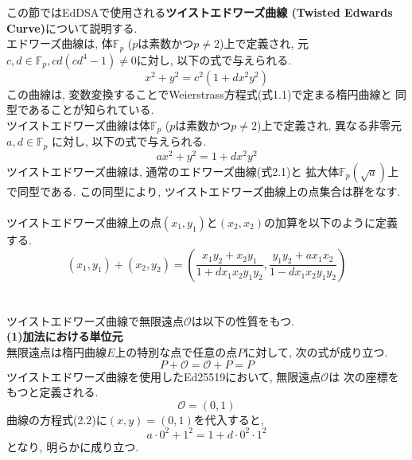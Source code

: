 この節ではEdDSAで使用される\textbf{ツイストエドワーズ曲線
(Twisted Edwards Curve)}について説明する.\\
\indent エドワーズ曲線は, 体$\mathbb{F}_p$ ($p$は素数かつ$p\neq 2$)上で定義され, 
元$c,d\in \mathbb{F}_p, cd(cd^{4}-1)\neq 0$に対し, 
以下の式で与えられる.
\begin{equation}
  x^2 + y^2 = c^2(1+dx^2y^2)
\end{equation}
この曲線は, 変数変換することでWeierstrass方程式(式1.1)で定まる楕円曲線と
同型であることが知られている\cite{edwarscurve-to-ellipticcurve}.\\
\indent ツイストエドワーズ曲線は体$\mathbb{F}_p$ ($p$は素数かつ$p\neq 2$)上で定義され, 
異なる非零元$a,d\in \mathbb{F}_p$ に対し, 以下の式で与えられる.
\begin{equation}
  ax^2 + y^2 = 1 + dx^2y^2
\end{equation}
ツイストエドワーズ曲線は, 通常のエドワーズ曲線(式2.1)と
拡大体$\mathbb{F}_p (\sqrt{a})$上で同型である. この同型により, 
ツイストエドワーズ曲線上の点集合は群をなす\cite{twisted}.\\[1em]
\\
\indent ツイストエドワーズ曲線上の点$(x_1,y_1)$と$(x_2,x_2)$の加算を以下のように定義する.
\begin{equation}
  (x_1,y_1)+(x_2,y_2)=
  \left( 
    \frac{x_1y_2+x_2y_1}{1+dx_1x_2y_1y_2},
    \frac{y_1y_2+ax_1x_2}{1-dx_1x_2y_1y_2} 
  \right)
\end{equation} \\[1em]
\\
\indent ツイストエドワーズ曲線で無限遠点$\mathcal{O}$は以下の性質をもつ.\\[0.5em]
\noindent\textbf{(1)加法における単位元}\\
\indent 無限遠点は楕円曲線$E$上の特別な点で任意の点$P$に対して, 次の式が成り立つ.
\begin{equation}
  P+\mathcal{O}=\mathcal{O}+P=P
\end{equation}
\indent ツイストエドワーズ曲線を使用したEd25519において, 無限遠点$\mathcal{O}$は
次の座標をもつと定義される.
\begin{equation}
  \mathcal{O}=(0,1)
\end{equation}
\indent 曲線の方程式(2.2)に$(x,y)=(0,1)$を代入すると,
\begin{equation}
  a\cdot 0^2 + 1^2 = 1 + d\cdot 0^{2}\cdot 1^2
\end{equation}
となり, 明らかに成り立つ.\\[1em]

